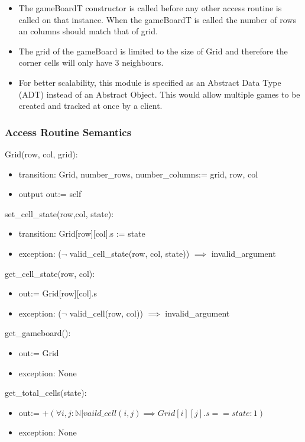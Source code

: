 \documentclass[12pt]{article}
\begin{document}
\begin{itemize}

\item The gameBoardT constructor is called before any other access
  routine is called on that instance. When the gameBoardT is called the number of 
  rows an columns should match that of grid.

\item The grid of the gameBoard is limited to the size of Grid and therefore the corner
	cells will only have 3 neighbours.

\item For better scalability, this module is specified as an Abstract Data Type
  (ADT) instead of an Abstract Object. This would allow multiple games to be
  created and tracked at once by a client.


\end{itemize}


\subsubsection* {Access Routine Semantics}
Grid(row, col, grid):
\begin{itemize}
\item transition: Grid, number\_rows, number\_columns:= grid, row, col
\item output out:= self
\end{itemize}
\noindent set\_cell\_state(row,col, state):
\begin{itemize}
\item transition: Grid[row][col].s := state
\item exception: ($\lnot$ valid\_cell\_state(row, col, state)) $\implies$ invalid\_argument  
\end{itemize}

\noindent get\_cell\_state(row, col):
\begin{itemize}
\item out:= Grid[row][col].s
\item exception: ($\lnot$ valid\_cell(row, col)) $\implies$ invalid\_argument
\end{itemize}


\noindent get\_gameboard():
\begin{itemize}
\item out:= Grid
\item exception: None
\end{itemize}

\noindent get\_total\_cells(state):
\begin{itemize}
\item out:= $+ (\forall i , j : \mathbb{N}|vaild\_cell(i,j) \implies  Grid[i][j].s == state: 1)$
\item exception: None
\end{itemize}
\end{document}
